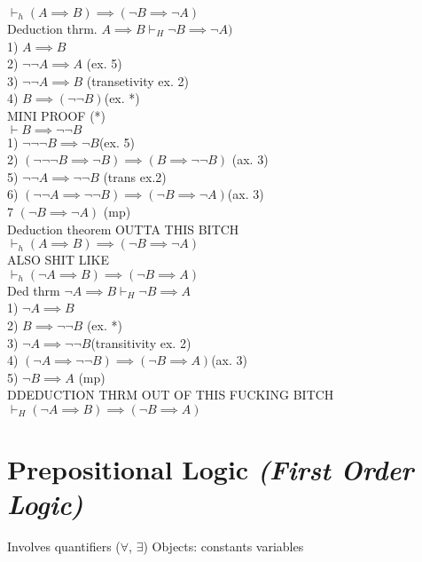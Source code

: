 \documentclass[12pt,oneside,notitlepage]{book}
\theoremstyle{definition}
\begin{document}
$\vdash_h (A \implies B) \implies (\neg B \implies \neg A)$ \\
Deduction thrm. $A \implies B \vdash_H \neg B \implies \neg A)$ \\
1) $A \implies B$ \\
2) $\neg \neg A \implies A$ (ex. 5) \\
3) $\neg \neg A \implies B$ (transetivity ex. 2) \\
4) $B \implies (\neg \neg B) $(ex. *) \\

MINI PROOF (*) \\
$\vdash B \implies \neg \neg B$ \\
1) $\neg \neg \neg B \implies \neg B $(ex. 5) \\
2) $(\neg \neg \neg B \implies \neg B) \implies (B \implies \neg \neg B)$ (ax. 3) \\

5) $\neg \neg A \implies \neg \neg B$ (trans ex.2) \\
6) $(\neg \neg A \implies \neg \neg B) \implies (\neg B \implies \neg A) $(ax. 3) \\
7 $(\neg B \implies \neg A)$ (mp) \\
Deduction theorem OUTTA THIS BITCH \\
$\vdash_h (A \implies B) \implies (\neg B \implies \neg A)$ \\

ALSO SHIT LIKE \\
$\vdash_h (\neg A \implies B) \implies (\neg B \implies A)$ \\
Ded thrm $\neg A \implies B \vdash_H \neg B \implies A$ \\
1) $\neg A \implies B$ \\
2) $B \implies \neg \neg B$ (ex. *) \\
3) $\neg A \implies \neg \neg B $(transitivity ex. 2) \\
4) $(\neg A \implies \neg \neg B ) \implies (\neg B \implies A) $(ax. 3) \\
5) $\neg B \implies A$ (mp) \\ 
DDEDUCTION THRM OUT OF THIS FUCKING BITCH \\
$\vdash_H (\neg A \implies B) \implies (\neg B \implies A)$


\chapter{Prepositional Logic \emph{(First Order Logic)}}
Involves quantifiers ($\forall$, $\exists$)
Objects: constants variables
\end{document}

